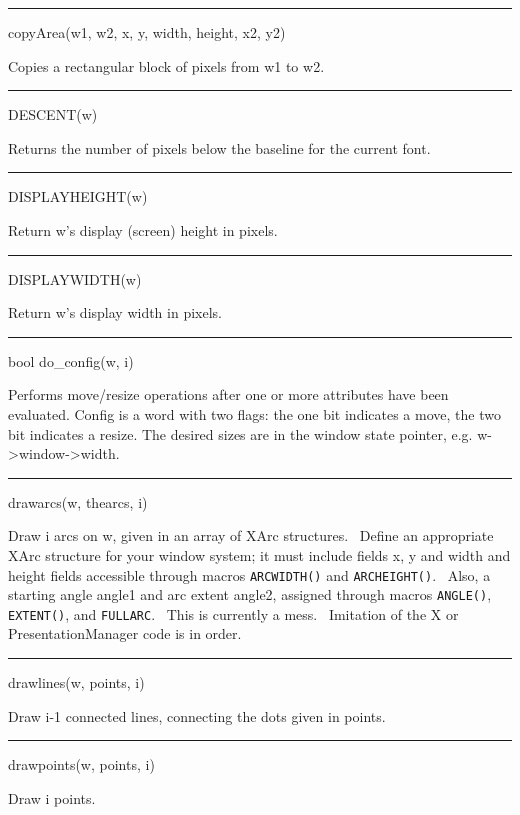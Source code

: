 {\sffamily\bfseries
\bigskip\hrule\vspace{0.1cm}
\noindent
copyArea(w1, w2, x, y, width, height, x2, y2)}


Copies a rectangular block of pixels from w1 to w2.

{\sffamily\bfseries
\bigskip\hrule\vspace{0.1cm}
\noindent
DESCENT(w)}


Returns the number of pixels below the baseline for the current font.


\bigskip\hrule\vspace{0.1cm}
\noindent
DISPLAYHEIGHT(w)


Return w's display (screen) height in pixels.

{\sffamily\bfseries
\bigskip\hrule\vspace{0.1cm}
\noindent
DISPLAYWIDTH(w)}


Return w's display width in pixels.

{\sffamily\bfseries
\bigskip\hrule\vspace{0.1cm}
\noindent
bool do\_config(w, i)}


Performs move/resize operations after one or more attributes have been
evaluated. Config is a word with two flags: the one bit indicates a
move, the two bit indicates a resize. The desired sizes are in the
window state pointer, e.g.
w-{\textgreater}window-{\textgreater}width.

{\sffamily\bfseries
\bigskip\hrule\vspace{0.1cm}
\noindent
drawarcs(w, thearcs, i)}


Draw i arcs on w, given in an array of XArc structures. \ Define an appropriate XArc structure for your window system;
it must include fields x, y and width and height fields accessible through macros \texttt{ARCWIDTH()} and
\texttt{ARCHEIGHT()}. \ Also, a starting angle angle1 and arc extent angle2, assigned through macros \texttt{ANGLE()},
\texttt{EXTENT()}, and \texttt{FULLARC}. \ This is currently a mess. \ Imitation of the X or PresentationManager code
is in order.


\bigskip\hrule\vspace{0.1cm}
\noindent
drawlines(w, points, i)


Draw i-1 connected lines, connecting the dots given in points.


\bigskip\hrule\vspace{0.1cm}
\noindent
drawpoints(w, points, i)


Draw i points.


